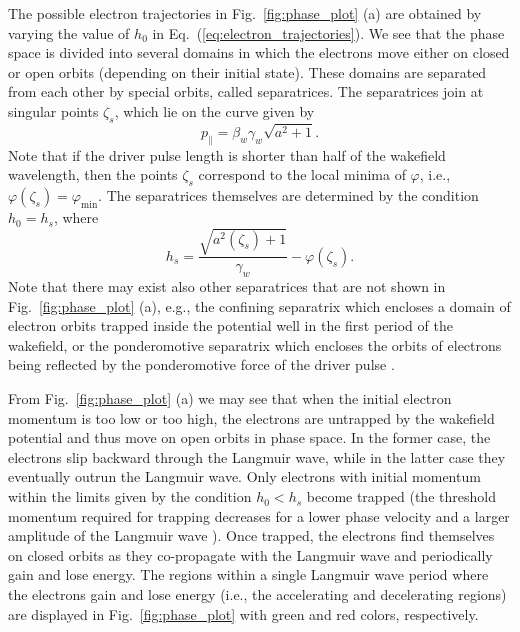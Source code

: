 \documentclass[10pt, a4paper, twoside, openright]{report}
\begin{document}
The possible electron trajectories in Fig.~\ref{fig:phase_plot} (a) are obtained by varying the value of $ h_0 $ in Eq.~(\ref{eq:electron_trajectories}). We see that the phase space is divided into several domains in which the electrons move either on closed or open orbits (depending on their initial state). These domains are separated from each other by special orbits, called separatrices. The separatrices join at singular points $ \zeta_s $, which lie on the curve given by \cite{Esirkepov2006}
\begin{equation}\label{eq:singular_points}
	p_{\parallel} = \beta_w \gamma_w \sqrt{a^2 + 1}.
\end{equation}
Note that if the driver pulse length is shorter than half of the wakefield wavelength, then the points $ \zeta_s $ correspond to the local minima of $ \varphi $, i.e., $ \varphi \left( \zeta_s \right) = \varphi_{\mathrm{min}} $. The separatrices themselves are determined by the condition $ h_0 = h_s $, where \cite{Esirkepov2006, Schroeder2006, Esarey2009}
\begin{equation}\label{eq:separatrix}
	h_s = \frac{\sqrt{a^2 \left( \zeta_{s} \right) + 1}}{\gamma_w} - \varphi \left( \zeta_{s} \right).
\end{equation}
Note that there may exist also other separatrices that are not shown in Fig.~\ref{fig:phase_plot} (a), e.g., the confining separatrix which encloses a domain of electron orbits trapped inside the potential well in the first period of the wakefield, or the ponderomotive separatrix which encloses the orbits of electrons being reflected by the ponderomotive force of the driver pulse \cite{Esirkepov2006}.

From Fig.~\ref{fig:phase_plot} (a) we may see that when the initial electron momentum is too low or too high, the electrons are untrapped by the wakefield potential and thus move on open orbits in phase space. In the former case, the electrons slip backward through the Langmuir wave, while in the latter case they eventually outrun the Langmuir wave. Only electrons with initial momentum within the limits given by the condition $ h_0 < h_s $ become trapped (the threshold momentum required for trapping decreases for a lower phase velocity and a larger amplitude of the Langmuir wave \cite{Schroeder2006}). Once trapped, the electrons find themselves on closed orbits as they co-propagate with the Langmuir wave and periodically gain and lose energy. The regions within a single Langmuir wave period where the electrons gain and lose energy (i.e., the accelerating and decelerating regions) are displayed in Fig.~\ref{fig:phase_plot} with green and red colors, respectively. 
\end{document}
